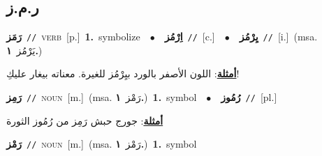 \documentclass[10pt,a4paper,twoside]{article} %
\begin{document}
\begin{multicols}{2}
\vspace{-3mm}
\subsection*{\color{blue}\foreignlanguage{arabic}{ر.م.ز}\color{blue}{}} 

{\setlength\topsep{0pt}\textbf{\foreignlanguage{arabic}{رَمَز}}\ {\color{gray}\texttt{//}\color{black}}\ \textsc{verb}\ [p.]\ \textbf{1.}~symbolize\ \ $\bullet$\ \ \setlength\topsep{0pt}\textbf{\foreignlanguage{arabic}{اِرْمُز}}\ {\color{gray}\texttt{//}\color{black}}\ [c.]\ \ $\bullet$\ \ \setlength\topsep{0pt}\textbf{\foreignlanguage{arabic}{يِرْمُز}}\ {\color{gray}\texttt{//}\color{black}}\ [i.]\ \color{gray}(msa. \foreignlanguage{arabic}{يَرْمُز}~\foreignlanguage{arabic}{\textbf{١.}})\color{black}\  \begin{flushright}\color{gray}\foreignlanguage{arabic}{\textbf{\underline{\foreignlanguage{arabic}{أمثلة}}}: اللون الأصفر بالورد بيِرْمُز للغيرة. معناته بيغار عليكِ!}\end{flushright}\color{black}} \vspace{2mm}

{\setlength\topsep{0pt}\textbf{\foreignlanguage{arabic}{رَمِز}}\ {\color{gray}\texttt{//}\color{black}}\ \textsc{noun}\ [m.]\ \color{gray}(msa. \foreignlanguage{arabic}{رَمْز}~\foreignlanguage{arabic}{\textbf{١.}})\color{black}\ \textbf{1.}~symbol\ \ $\bullet$\ \ \setlength\topsep{0pt}\textbf{\foreignlanguage{arabic}{رُمُوز}}\ {\color{gray}\texttt{//}\color{black}}\ [pl.]\  \begin{flushright}\color{gray}\foreignlanguage{arabic}{\textbf{\underline{\foreignlanguage{arabic}{أمثلة}}}: جورج حبش رَمِز من رُمُوز الثورة}\end{flushright}\color{black}} \vspace{2mm}

{\setlength\topsep{0pt}\textbf{\foreignlanguage{arabic}{رَمْز}}\ {\color{gray}\texttt{//}\color{black}}\ \textsc{noun}\ [m.]\ \color{gray}(msa. \foreignlanguage{arabic}{رَمْز}~\foreignlanguage{arabic}{\textbf{١.}})\color{black}\ \textbf{1.}~symbol\ } \vspace{2mm}


\end{multicols}
\end{document}
